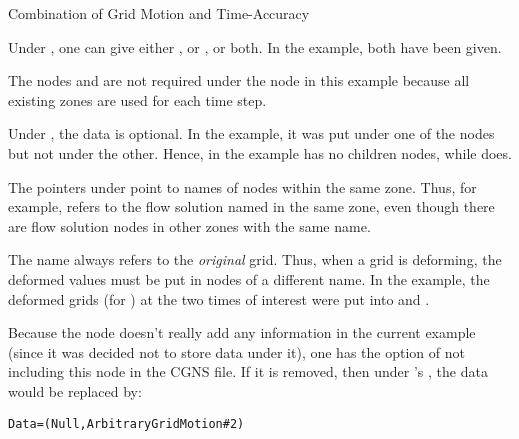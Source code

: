 \begin{example}{Combination of Grid Motion and Time-Accuracy}
\begin{notes}
\item Under , one can give either
      , or , or both.
      In the example, both have been given.
\item The nodes  and  are not
      required under the  node in this example
      because all existing zones are used for each time step.
\item Under , the  data
      is optional.
      In the example, it was put under one of the nodes but not under
      the other.
      Hence,  in the example has no
      children nodes, while  does.
\item The pointers under  point to names of
      nodes within the same zone.
      Thus, for example,  refers to the flow solution
      named  in the same zone, even though there are flow
      solution nodes in other zones with the same name.
\item The name  always refers to the
      \emph{original} grid.
      Thus, when a grid is deforming, the deformed values must be put in
       nodes of a different name.
      In the example, the deformed grids (for ) at the two
      times of interest were put into  and
      .
\item Because the node  doesn't really
      add any information in the current example (since it was decided
      not to store  data under it), one has the option
      of not including this node in the CGNS file.
      If it is removed, then under 's ,
      the  data would be replaced by:
      \begin{alltt}
   Data = (Null, ArbitraryGridMotion\#2)
      \end{alltt}
\end{notes}
\end{example}
